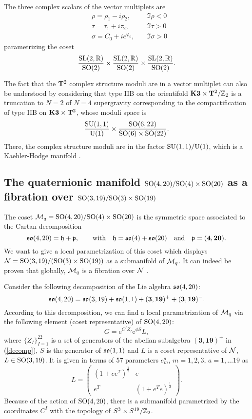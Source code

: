 \documentclass[a4paper,12pt]{article}
\begin{document}
The three complex scalars of the  vector multiplets are
\begin{eqnarray} &\rho=\rho_1-i\rho_2,\quad &\Im\rho < 0\nonumber\\
&\tau=\tau_1 +i\tau_2, \quad &\Im\tau >0\nonumber\\
&\sigma=C_0+ie^{\varphi_0}, \quad &\Im
\sigma>0\label{imaginario}\end{eqnarray} parametrizing the coset
$$\frac {\mathrm{SL}(2,\mathbb{R})}{\mathrm{SO}(2)}\times \frac
{\mathrm{SL}(2,\mathbb{R})}{\mathrm{SO}(2)}\times \frac {\mathrm{SL}(2,\mathbb{R})}{\mathrm{SO}(2)}.$$

The fact that the $\mathbf{T}^2$ complex structure moduli are in a vector
multiplet can also be understood by considering that type IIB on
the orientifold $\mathbf{K3}\times \mathbf{T}^2/\mathbb{Z}_2$ is a truncation to $N=2$ of
$N=4$ supergravity corresponding to the compactification of type
IIB on $\mathbf{K3}\times \mathbf{T}^2$, whose moduli space is
$$\frac {\mathrm{SU}(1,1)}{\mathrm{U}(1)}\times \frac
{\mathrm{SO}(6,22)}{\mathrm{SO}(6)\times \mathrm{SO}(22)}.$$ There, the complex
structure moduli are in the factor ${\mathrm{SU}(1,1)}/{\mathrm{U}(1)}$, which
is a Kaehler-Hodge manifold \cite{dlr}.



\subsection{The quaternionic manifold ${\mathrm{SO}(4,20)}/{\mathrm{SO}(4)\times
\mathrm{SO}(20)}$ as a fibration over ${\mathrm{SO}(3,19)}/{\mathrm{SO}(3)\times
\mathrm{SO}(19)}$}

The coset $\mathcal{M}_q={\mathrm{SO}(4,20)}/{\mathrm{SO}(4)\times \mathrm{SO}(20)}$ is the
symmetric space associated to the Cartan decomposition
$$\mathfrak{so}(4,20)=\mathfrak{h}+ \mathfrak{p}, \qquad \mathrm{with}\quad \mathfrak{h}=\mathfrak{so}(4)+\mathfrak{so}(20)\quad \mathrm{and} \quad \mathfrak{p}=
(\mathbf{4},\mathbf{20}).$$ We want to give a local
parametrization of this coset which displays
$\mathcal{N}={\mathrm{SO}(3,19)}/({\mathrm{SO}(3)\times \mathrm{SO}(19)})$ as a submanifold of
$\mathcal{M}_q$. It can indeed be proven that globally, $\mathcal{M}_q$ is a
fibration over $\mathcal{N}$ \cite{st}.


Consider the following decomposition of the Lie algebra
$\mathfrak{so}(4,20)$:
\begin{equation}\mathfrak{so}(4,20)=\mathfrak{so}(3,19)+\mathfrak{so}(1,1)+
(\mathbf{3},\mathbf{19})^++(\mathbf{3},\mathbf{19})^-.\label{decomp}\end{equation}
According to this decomposition, we can find a local
parametrization of  $\mathcal{M}_q$ via the following element (coset
representative) of ${\mathrm{SO}(4,20)}$:
\begin{equation}G=\mathrm{e}^{C^IZ_I}\mathrm{e}^{\phi S}{L},\label{parametrization}\end{equation} where
$\{Z_I\}_{I=1}^{22}$ is a set of generators of the abelian
subalgebra $(\mathbf{3},\mathbf{19})^+$ in (\ref{decomp}), $S$ is
the generator of $\mathfrak{so}(1,1)$ and $L$ is a coset representative of
$\mathcal{N}$, $L\in \mathrm{SO}(3,19)$. It is given in terms of 57 parameters
$e_m^a$, $m=1,2,3$, $a=1,\dots 19$ as
$$L=\begin{pmatrix}(1+ee^T)^\frac 1 2&e\\e^T& (1+e^Te)^{\frac 12}\end{pmatrix}.$$
Because of the action of $\mathrm{SO}(4,20)$, there is a submanifold
parametrized by the coordinates $C^I$ with the topology of
$S^3\times S^{19}/\mathbb{Z}_2$.
\end{document}
